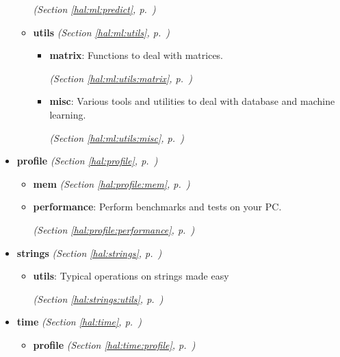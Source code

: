\begin{itemize}
\begin{itemize}
  \textit{(Section \ref{hal:ml:predict}, p.~\pageref{hal:ml:predict})}

    \item \textbf{utils}
  \textit{(Section \ref{hal:ml:utils}, p.~\pageref{hal:ml:utils})}

      \begin{itemize}
    \setlength{\parskip}{0ex}
        \item \textbf{matrix}: Functions to deal with matrices. 


  \textit{(Section \ref{hal:ml:utils:matrix}, p.~\pageref{hal:ml:utils:matrix})}

        \item \textbf{misc}: Various tools and utilities to deal with database and machine learning. 


  \textit{(Section \ref{hal:ml:utils:misc}, p.~\pageref{hal:ml:utils:misc})}

      \end{itemize}
  \end{itemize}
\item \textbf{profile}
  \textit{(Section \ref{hal:profile}, p.~\pageref{hal:profile})}

  \begin{itemize}
\setlength{\parskip}{0ex}
    \item \textbf{mem}
  \textit{(Section \ref{hal:profile:mem}, p.~\pageref{hal:profile:mem})}

    \item \textbf{performance}: Perform benchmarks and tests on your PC. 


  \textit{(Section \ref{hal:profile:performance}, p.~\pageref{hal:profile:performance})}

  \end{itemize}
\item \textbf{strings}
  \textit{(Section \ref{hal:strings}, p.~\pageref{hal:strings})}

  \begin{itemize}
\setlength{\parskip}{0ex}
    \item \textbf{utils}: Typical operations on strings made easy 


  \textit{(Section \ref{hal:strings:utils}, p.~\pageref{hal:strings:utils})}

  \end{itemize}
\item \textbf{time}
  \textit{(Section \ref{hal:time}, p.~\pageref{hal:time})}

  \begin{itemize}
\setlength{\parskip}{0ex}
    \item \textbf{profile}
  \textit{(Section \ref{hal:time:profile}, p.~\pageref{hal:time:profile})}


\end{itemize}
\end{itemize}
